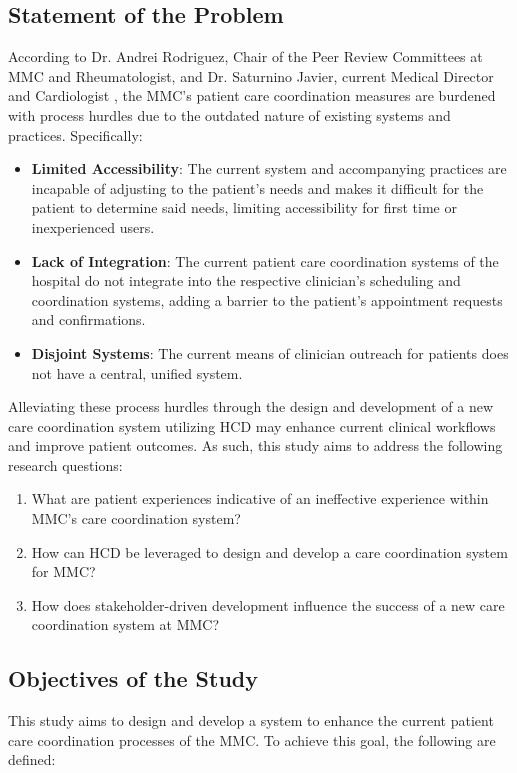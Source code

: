 \documentclass[11pt,a4paper,titlepage]{article}
\begin{document}
	\subsection{Statement of the Problem}
	According to Dr. Andrei Rodriguez, Chair of the Peer Review Committees at MMC and Rheumatologist, and Dr. Saturnino Javier, current Medical Director and Cardiologist \cite{Rodriguez_A, Javier_S}, the MMC's patient care coordination measures are burdened with process hurdles due to the outdated nature of existing systems and practices. Specifically: 
	\begin{itemize}
		\item \textbf{Limited Accessibility}: The current system and accompanying practices are incapable of adjusting to the patient's needs and makes it difficult for the patient to determine said needs, limiting accessibility for first time or inexperienced users. 
		\item \textbf{Lack of Integration}: The current patient care coordination systems of the hospital  do not integrate into the respective clinician's scheduling and coordination systems, adding a barrier to the patient's appointment requests and confirmations.
		\item \textbf{Disjoint Systems}: The current means of clinician outreach for patients does not have a central, unified system.   
	\end{itemize}
	Alleviating these process hurdles through the design and development of a new care coordination system utilizing HCD may enhance current clinical workflows and improve patient outcomes. As such, this study aims to address the following research questions: 
	\begin{enumerate}
		\item What are patient experiences indicative of an ineffective experience within MMC's care coordination system? 
		\item How can HCD be leveraged to design and develop a care coordination system for MMC?
		\item How does stakeholder-driven development influence the success of a new care coordination system at MMC? 
	\end{enumerate}
	
	\subsection{Objectives of the Study}
	This study aims to design and develop a system to enhance the current patient care coordination processes of the MMC. To achieve this goal, the following are defined: 
\end{document}
